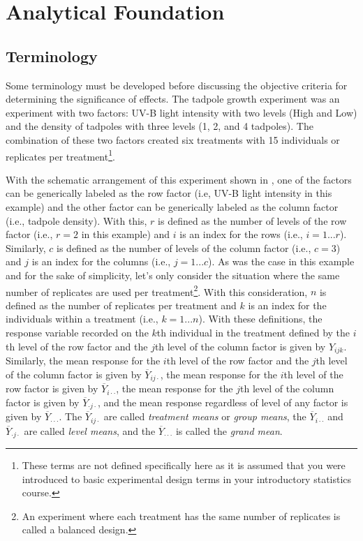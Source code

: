 \documentclass[10pt,openany]{book}\usepackage[]{graphicx}\usepackage[]{color}
\begin{document}
\section{Analytical Foundation}
\subsection{Terminology}
Some terminology must be developed before discussing the objective criteria for determining the significance of effects.  The tadpole growth experiment  was an experiment with two factors: UV-B light intensity with two levels (High and Low) and the density of tadpoles with three levels (1, 2, and 4 tadpoles).  The combination of these two factors created six treatments with 15 individuals or replicates per treatment\footnote{These terms are not defined specifically here as it is assumed that you were introduced to basic experimental design terms in your introductory statistics course.}.

With the schematic arrangement of this experiment shown in , one of the factors can be generically labeled as the row factor (i.e, UV-B light intensity in this example) and the other factor can be generically labeled as the column factor (i.e., tadpole density).  With this, $r$ is defined as the number of levels of the row factor (i.e., $r=2$ in this example) and $i$ is an index for the rows (i.e., $i=1...r$).  Similarly, $c$ is defined as the number of levels of the column factor (i.e., $c=3$) and $j$ is an index for the columns (i.e., $j=1...c$).  As was the case in this example and for the sake of simplicity, let's only consider the situation where the same number of replicates are used per treatment\footnote{An experiment where each treatment has the same number of replicates is called a balanced design.}.  With this consideration, $n$ is defined as the number of replicates per treatment and $k$ is an index for the individuals within a treatment (i.e., $k=1...n$).  With these definitions, the response variable recorded on the $k$th individual in the treatment defined by the $i$th level of the row factor and the $j$th level of the column factor is given by $Y_{ijk}$.  Similarly, the mean response for the $i$th level of the row factor and the $j$th level of the column factor is given by $\overline{Y}_{ij\cdot}$, the mean response for the $i$th level of the row factor is given by $\overline{Y}_{i\cdot\cdot}$, the mean response for the $j$th level of the column factor is given by $\overline{Y}_{\cdot j\cdot}$, and the mean response regardless of level of any factor is given by $\overline{Y}_{\cdot\cdot\cdot}$.  The $\overline{Y}_{ij\cdot}$ are called \emph{treatment means} or \emph{group means}, the $\overline{Y}_{i\cdot\cdot}$ and $\overline{Y}_{\cdot j\cdot}$ are called \emph{level means}, and the $\overline{Y}_{\cdot\cdot\cdot}$ is called the \emph{grand mean}.
\end{document}
